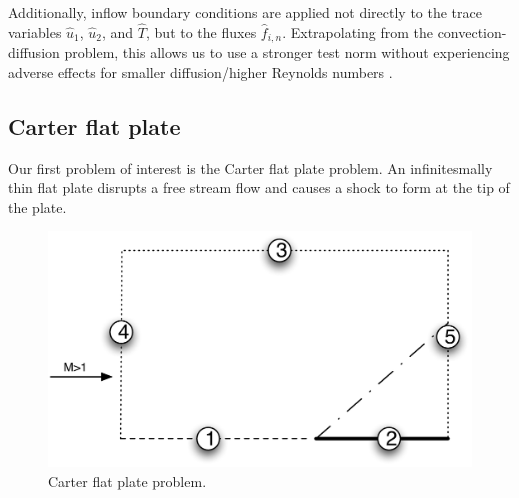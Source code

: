 \documentclass{article}
\begin{document}
Additionally, inflow boundary conditions are applied not directly to the trace variables $\widehat{u}_1$, $\widehat{u}_2$, and $\widehat{T}$, but to the fluxes $\widehat{f}_{i,n}$. Extrapolating from the convection-diffusion problem, this allows us to use a stronger test norm without experiencing adverse effects for smaller diffusion/higher Reynolds numbers \cite{DPGrobustness,DPGrobustness2}.

\subsection{Carter flat plate}

Our first problem of interest is the Carter flat plate problem. An infinitesmally thin flat plate disrupts a free stream flow and causes a shock to form at the tip of the plate. 

\begin{figure}[!h]
\centering
\includegraphics[scale=.5]{figs/flat_plate_BCs.pdf}
\caption{Carter flat plate problem.}
\end{figure}
\end{document}
